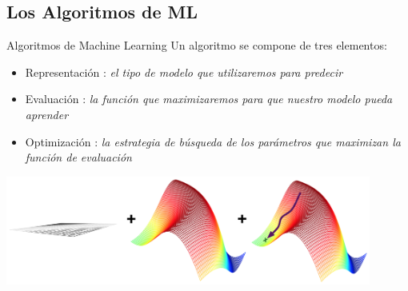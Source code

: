 \documentclass[11pt]{beamer}
\begin{document}
\subsection{Los Algoritmos de ML}
\begin{frame}{Algoritmos de Machine Learning}
    Un algoritmo se compone de tres elementos:
    \begin{itemize}%
        \item Representaci\'on
            {: \textit{el tipo de modelo que utilizaremos para predecir}}
        \item Evaluaci\'on
            {: \textit{la funci\'on que maximizaremos para que nuestro modelo pueda aprender}}
        \item Optimizaci\'on
            {: \textit{la estrategia de b\'usqueda de los par\'ametros que maximizan la funci\'on de evaluaci\'on}}
    \end{itemize}
\includegraphics[width=0.9\textwidth]{images/representation+evaluation+optimization.png}
\end{frame}
\end{document}
